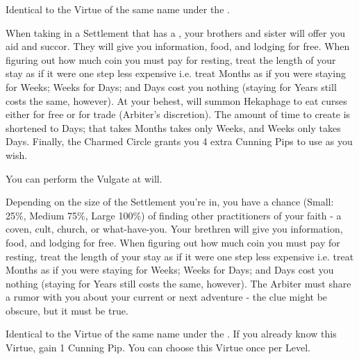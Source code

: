 \begin{multicols*}{2}



Identical to the Virtue of the same name under the .


When taking  in a Settlement that has a , your brothers and sister will offer you aid and succor. They will give you information, food, and lodging for free. When figuring out how much coin you must pay for resting, treat the length of your stay as if it were one step less expensive i.e. treat Months as if you were staying for Weeks; Weeks for Days; and Days cost you nothing (staying for Years still costs the same, however). At your behest,  will summon Hekaphage to eat curses either for free or for trade (Arbiter's discretion). The amount of time to create  is shortened to Days;  that takes Months takes only Weeks, and Weeks only takes Days. Finally, the Charmed Circle grants you 4 extra Cunning Pips to use as you wish.


You can perform the  Vulgate at will.

\cbreak


Depending on the size of the Settlement you're in, you have a chance (Small: 25\%, Medium 75\%, Large 100\%) of finding other practitioners of your faith - a coven, cult, church, or what-have-you.  Your brethren will give you information, food, and lodging for free. When figuring out how much coin you must pay for resting, treat the length of your stay as if it were one step less expensive i.e. treat Months as if you were staying for Weeks; Weeks for Days; and Days cost you nothing (staying for Years still costs the same, however). The Arbiter must share a rumor with you about your current or next adventure - the clue might be obscure, but it must be true.


Identical to the Virtue of the same name under the . If you already know this Virtue, gain 1 Cunning Pip. You can choose this Virtue once per Level.


\end{multicols*}
